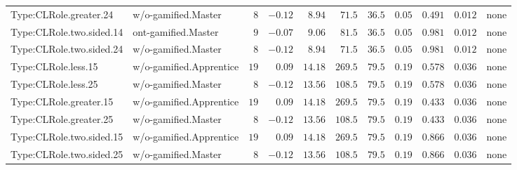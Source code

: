\documentclass[6pt,a4paper]{article}
\begin{document}
{\begin{longtable}{llrrrrrrrrl}
Type:CLRole.greater.24&w/o-gamified.Master&$ 8$&$-0.12$&$ 8.94$&$ 71.5$&$ 36.5$&$ 0.05$&$0.491$&$0.012$&none\tabularnewline
Type:CLRole.two.sided.14&ont-gamified.Master&$ 9$&$-0.07$&$ 9.06$&$ 81.5$&$ 36.5$&$ 0.05$&$0.981$&$0.012$&none\tabularnewline
Type:CLRole.two.sided.24&w/o-gamified.Master&$ 8$&$-0.12$&$ 8.94$&$ 71.5$&$ 36.5$&$ 0.05$&$0.981$&$0.012$&none\tabularnewline
Type:CLRole.less.15&w/o-gamified.Apprentice&$19$&$ 0.09$&$14.18$&$269.5$&$ 79.5$&$ 0.19$&$0.578$&$0.036$&none\tabularnewline
Type:CLRole.less.25&w/o-gamified.Master&$ 8$&$-0.12$&$13.56$&$108.5$&$ 79.5$&$ 0.19$&$0.578$&$0.036$&none\tabularnewline
Type:CLRole.greater.15&w/o-gamified.Apprentice&$19$&$ 0.09$&$14.18$&$269.5$&$ 79.5$&$ 0.19$&$0.433$&$0.036$&none\tabularnewline
Type:CLRole.greater.25&w/o-gamified.Master&$ 8$&$-0.12$&$13.56$&$108.5$&$ 79.5$&$ 0.19$&$0.433$&$0.036$&none\tabularnewline
\newpage
Type:CLRole.two.sided.15&w/o-gamified.Apprentice&$19$&$ 0.09$&$14.18$&$269.5$&$ 79.5$&$ 0.19$&$0.866$&$0.036$&none\tabularnewline
Type:CLRole.two.sided.25&w/o-gamified.Master&$ 8$&$-0.12$&$13.56$&$108.5$&$ 79.5$&$ 0.19$&$0.866$&$0.036$&none\tabularnewline
\hline
\end{longtable}}
\end{document}
